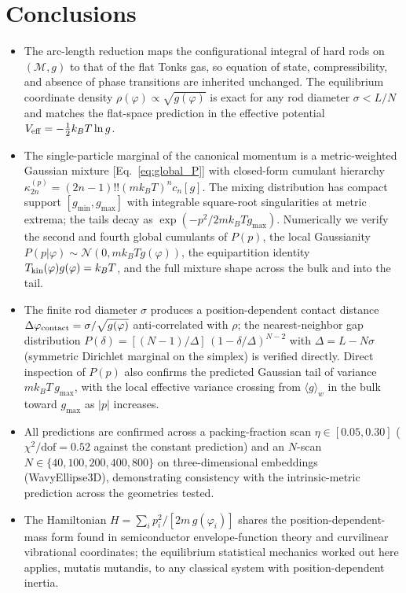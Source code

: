 \documentclass[aps,pre,twocolumn,superscriptaddress,longbibliography,floatfix]{revtex4-2}
\begin{document}
\section{Conclusions}
\label{sec:conclusions}

\begin{itemize}

\item The arc-length reduction maps the configurational integral of hard rods on
$(\mathcal{M},g)$ to that of the flat Tonks gas, so equation of state, compressibility,
and absence of phase transitions are inherited unchanged.
The equilibrium coordinate density $\rho(\varphi)\propto\sqrt{g(\varphi)}$ is exact for
any rod diameter $\sigma<L/N$ and matches the flat-space prediction in the effective
potential $V_{\rm eff}=-\tfrac{1}{2}k_BT\ln g$.

\item The single-particle marginal of the canonical momentum is a metric-weighted Gaussian mixture
[Eq.~\eqref{eq:global_P}] with closed-form cumulant hierarchy
$\kappa_{2n}^{(p)}=(2n-1)!!(mk_BT)^n c_n[g]$.
The mixing distribution has compact support $[g_{\min},g_{\max}]$ with integrable square-root
singularities at metric extrema; the tails decay as $\exp(-p^2/2mk_BTg_{\max})$.
Numerically we verify the second and fourth global cumulants of $P(p)$, the local Gaussianity
$P(p|\varphi)\sim\mathcal{N}(0,mk_BTg(\varphi))$, the equipartition identity
$T_{\rm kin}(\varphi)g(\varphi)=k_BT$, and the full mixture shape across the bulk and into
the tail.

\item The finite rod diameter $\sigma$ produces a position-dependent contact distance
$\Delta\varphi_{\rm contact}=\sigma/\sqrt{g(\varphi)}$ anti-correlated with $\rho$;
the nearest-neighbor gap distribution
$P(\delta)=[(N-1)/\Delta]\,(1-\delta/\Delta)^{N-2}$ with $\Delta=L-N\sigma$
(symmetric Dirichlet marginal on the simplex) is verified directly.
Direct inspection of $P(p)$ also confirms the predicted Gaussian tail of variance
$mk_BT\,g_{\max}$, with the local effective variance crossing from
$\langle g\rangle_w$ in the bulk toward $g_{\max}$ as $|p|$ increases.

\item All predictions are confirmed across a packing-fraction scan
$\eta\in[0.05,0.30]$ ($\chi^2/\mathrm{dof}=0.52$ against the constant prediction) and
an $N$-scan $N\in\{40,100,200,400,800\}$ on three-dimensional embeddings
(WavyEllipse3D), demonstrating consistency with the intrinsic-metric
prediction across the geometries tested.

\item The Hamiltonian $H=\sum_i p_i^2/[2m\,g(\varphi_i)]$ shares the position-dependent-mass
form found in semiconductor envelope-function theory and curvilinear vibrational coordinates;
the equilibrium statistical mechanics worked out here applies, mutatis mutandis, to any
classical system with position-dependent inertia.

\end{itemize}
\end{document}

